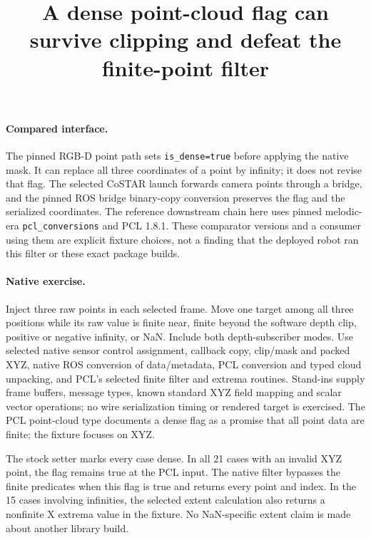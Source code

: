 \documentclass{article}
\begin{document}
\title{A dense point-cloud flag can survive clipping and defeat the finite-point filter}
\maketitle

\paragraph{Compared interface.}
The pinned RGB-D point path sets \texttt{is\_dense=true} before
applying the native mask. It can replace all three coordinates of
a point by infinity; it does not revise that flag. The selected
CoSTAR launch forwards camera points through a bridge, and the
pinned ROS bridge binary-copy conversion preserves the flag and
the serialized coordinates. The reference downstream chain here
uses pinned melodic-era \texttt{pcl\_conversions} and PCL 1.8.1.
These comparator versions and a consumer using them are explicit
fixture choices, not a finding that the deployed robot ran this
filter or these exact package builds.

\paragraph{Native exercise.}
Inject three raw points in each selected frame. Move one target
among all three positions while its raw value is finite near,
finite beyond the software depth clip, positive or negative
infinity, or NaN. Include both depth-subscriber modes. Use selected
native sensor control assignment, callback copy, clip/mask and
packed XYZ, native ROS conversion of data/metadata, PCL conversion
and typed cloud unpacking, and PCL's selected finite filter and
extrema routines. Stand-ins supply frame buffers, message types,
known standard XYZ field mapping and scalar vector operations;
no wire serialization timing or rendered target is exercised.
The PCL point-cloud type documents a dense flag as a promise that
all point data are finite; the fixture focuses on XYZ.

The stock setter marks every case dense. In all 21 cases with an
invalid XYZ point, the flag remains true at the PCL input.
The native filter bypasses the finite predicates when this
flag is true and returns every point and index. In the 15
cases involving infinities, the selected extent calculation
also returns a nonfinite X extrema value in the fixture. No
NaN-specific extent claim is made about another library build.
\end{document}
